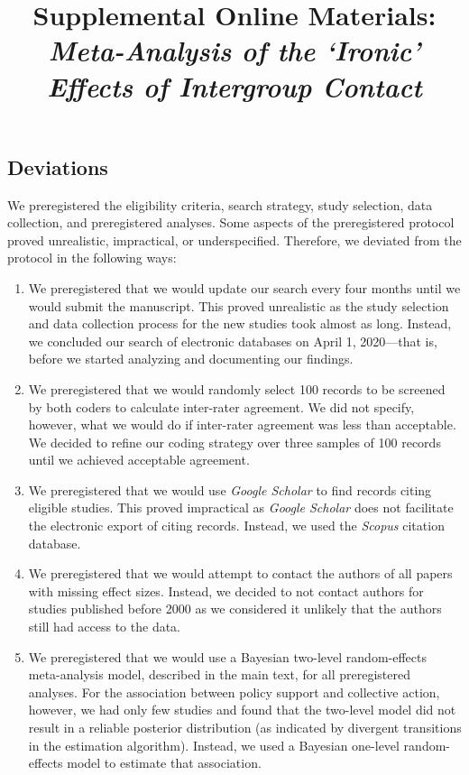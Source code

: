 \documentclass[12pt, letterpaper]{article}
\title{ Supplemental Online Materials:\\\textit{Meta-Analysis of the `Ironic' Effects of Intergroup Contact} }
\author{  }
\begin{document}
\maketitle

\hypertarget{deviations}{%
\subsection{Deviations}\label{deviations}}

We preregistered the eligibility criteria, search strategy, study
selection, data collection, and preregistered analyses. Some aspects of
the preregistered protocol proved unrealistic, impractical, or
underspecified. Therefore, we deviated from the protocol in the
following ways:

\begin{enumerate}
\def\labelenumi{\arabic{enumi}.}
\item
  We preregistered that we would update our search every four months
  until we would submit the manuscript. This proved unrealistic as the
  study selection and data collection process for the new studies took
  almost as long. Instead, we concluded our search of electronic
  databases on April 1, 2020---that is, before we started analyzing and
  documenting our findings.
\item
  We preregistered that we would randomly select 100 records to be
  screened by both coders to calculate inter-rater agreement. We did not
  specify, however, what we would do if inter-rater agreement was less
  than acceptable. We decided to refine our coding strategy over three
  samples of 100 records until we achieved acceptable agreement.
\item
  We preregistered that we would use \emph{Google Scholar} to find
  records citing eligible studies. This proved impractical as
  \emph{Google Scholar} does not facilitate the electronic export of
  citing records. Instead, we used the \emph{Scopus} citation database.
\item
  We preregistered that we would attempt to contact the authors of all
  papers with missing effect sizes. Instead, we decided to not contact
  authors for studies published before 2000 as we considered it unlikely
  that the authors still had access to the data.
\item
  We preregistered that we would use a Bayesian two-level random-effects
  meta-analysis model, described in the main text, for all preregistered
  analyses. For the association between policy support and collective
  action, however, we had only few studies and found that the two-level
  model did not result in a reliable posterior distribution (as
  indicated by divergent transitions in the estimation algorithm).
  Instead, we used a Bayesian one-level random-effects model to estimate
  that association.
\end{enumerate}
\end{document}
